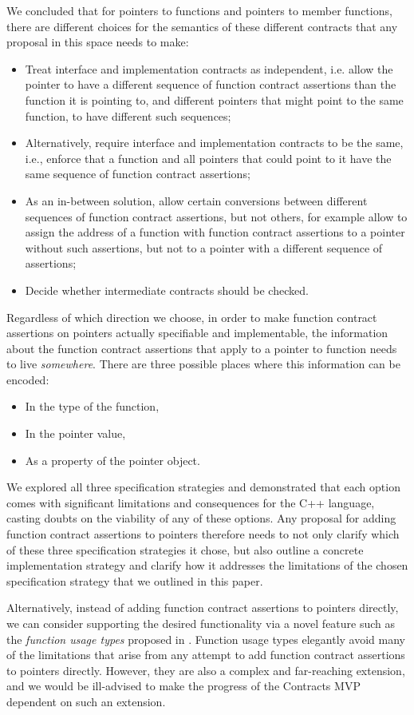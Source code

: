 We concluded that for pointers to functions and pointers to member functions, there are different choices for the semantics of these different contracts that any proposal in this space needs to make:
\begin{itemize}
\item Treat interface and implementation contracts as independent, i.e. allow the pointer to have a different sequence of function contract assertions than the function it is pointing to, and different pointers that might point to the same function, to have different such sequences;
\item Alternatively, require interface and implementation contracts to be the same, i.e., enforce that a function and all pointers that could point to it have the same sequence of function contract assertions;
\item As an in-between solution, allow certain conversions between different sequences of function contract assertions, but not others, for example allow to assign the address of a function with function contract assertions to a pointer without such assertions, but not to a pointer with a different sequence of assertions;
\item Decide whether intermediate contracts should be checked.
\end{itemize}
Regardless of which direction we choose, in order to make function contract assertions on pointers actually specifiable and implementable, the information about the function contract assertions that apply to a pointer to function needs to live \emph{somewhere}. There are three possible places where this information can be encoded:
\begin{itemize}
\item In the type of the function,
\item In the pointer value,
\item As a property of the pointer object.
\end{itemize}
We explored all three specification strategies and demonstrated that each option comes with significant limitations and consequences for the C++ language, casting doubts on the viability of any of these options. Any proposal for adding function contract assertions to pointers therefore needs to not only clarify which of these three specification strategies it chose, but also outline a concrete implementation strategy and clarify how it addresses the limitations of the chosen specification strategy that we outlined in this paper.

Alternatively, instead of adding function contract assertions to pointers directly, we can consider supporting the desired functionality via a novel feature such as the \emph{function usage types} proposed in \cite{P3271R0}. Function usage types elegantly avoid many of the limitations that arise from any attempt to add function contract assertions to pointers directly. However, they are also a complex and far-reaching extension, and we would be ill-advised to make the progress of the Contracts MVP \cite{P2900R7} dependent on such an extension.

